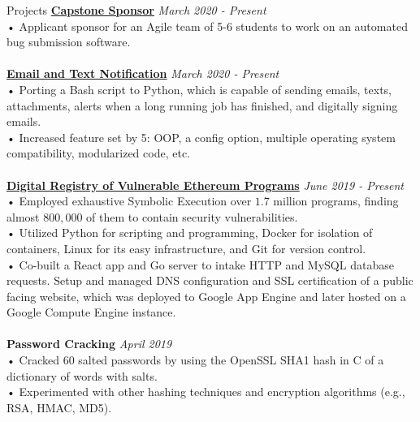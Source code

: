 \documentclass{resume} %
\begin{document}
\iffalse
\begin{rSection}{Objective}
  Interested in Software Development, Software Engineering, or anything that touches the software development lifecycle. Equipped with varying skills from experience in graduate work, projects, and courses.
\end{rSection}
\fi
\begin{rSection}{Projects}
  {\bf \href{https://docs.google.com/presentation/d/11ACdzalpubDKvJFnA6a\_5ST7Dd3P\_EbLrq1DEpJKloM/edit#slide=id.p}{Capstone Sponsor}} \hfill {\em{March 2020 - Present}}
  \\• Applicant sponsor for an Agile team of 5-6 students to work on an automated bug submission software.\\
  \\{\bf \href{https://github.com/tdulcet/Send-Msg-CLI/tree/python-port}{Email and Text Notification}} \hfill {\em{March 2020 - Present}}
  \\• Porting a Bash script to Python, which is capable of sending emails, texts, attachments, alerts when a long running job has finished, and digitally signing emails.
  \\• Increased feature set by 5: OOP, a config option, multiple operating system compatibility, modularized code, etc.\\
    \\{\bf \href{https://www.haveibeenexploited.com/}{Digital Registry of Vulnerable Ethereum Programs}} \hfill {\em{June 2019 - Present}}
  \\• Employed exhaustive Symbolic Execution over $1.7$ million programs, finding almost $800,000$ of them to contain security vulnerabilities.
  \\• Utilized Python for scripting and programming, Docker for isolation of containers, Linux for its easy infrastructure, and Git for version control.
  \\• Co-built a React app and Go server to intake HTTP and MySQL database requests. Setup and managed DNS configuration and SSL certification of a public facing website, which was deployed to Google App Engine and later hosted on a Google Compute Engine instance.\\
  \\{\bf Password Cracking} \hfill {\em{April 2019}}
  \\• Cracked 60 salted passwords by using the OpenSSL SHA1 hash in C of a dictionary of words with salts.
  \\• Experimented with other hashing techniques and encryption algorithms (e.g., RSA, HMAC, MD5).

\end{rSection}
\end{document}
